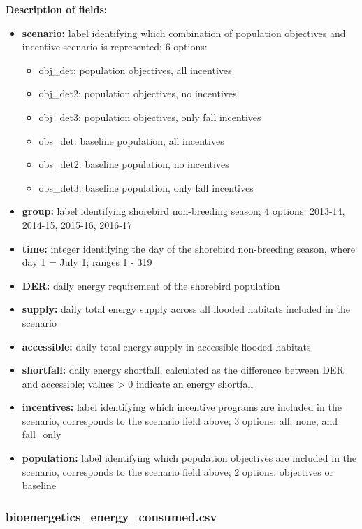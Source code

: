 \documentclass[]{article}
\providecommand{\tightlist}{%
  \setlength{\itemsep}{0pt}\setlength{\parskip}{0pt}}
\begin{document}
\textbf{Description of fields:}

\begin{itemize}
\tightlist
\item
  \textbf{scenario:} label identifying which combination of population
  objectives and incentive scenario is represented; 6 options:

  \begin{itemize}
  \tightlist
  \item
    obj\_det: population objectives, all incentives
  \item
    obj\_det2: population objectives, no incentives
  \item
    obj\_det3: population objectives, only fall incentives
  \item
    obs\_det: baseline population, all incentives
  \item
    obs\_det2: baseline population, no incentives
  \item
    obs\_det3: baseline population, only fall incentives
  \end{itemize}
\item
  \textbf{group:} label identifying shorebird non-breeding season; 4
  options: 2013-14, 2014-15, 2015-16, 2016-17
\item
  \textbf{time:} integer identifying the day of the shorebird
  non-breeding season, where day 1 = July 1; ranges 1 - 319
\item
  \textbf{DER:} daily energy requirement of the shorebird population
\item
  \textbf{supply:} daily total energy supply across all flooded habitats
  included in the scenario
\item
  \textbf{accessible:} daily total energy supply in accessible flooded
  habitats
\item
  \textbf{shortfall:} daily energy shortfall, calculated as the
  difference between DER and accessible; values \textgreater{} 0
  indicate an energy shortfall
\item
  \textbf{incentives:} label identifying which incentive programs are
  included in the scenario, corresponds to the scenario field above; 3
  options: all, none, and fall\_only
\item
  \textbf{population:} label identifying which population objectives are
  included in the scenario, corresponds to the scenario field above; 2
  options: objectives or baseline
\end{itemize}

\subsubsection{bioenergetics\_energy\_consumed.csv}\label{bioenergetics_energy_consumed.csv}
\end{document}

